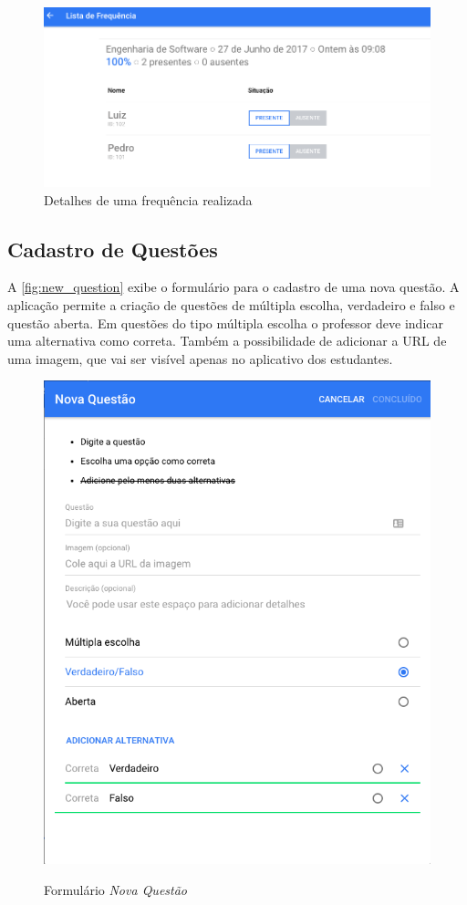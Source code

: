 \begin{figure}[ht]
  \centering
  \caption{Detalhes de uma frequência realizada}
  \label{fig:list_freq}
  \includegraphics[scale=.35]{imagens/telas/list_freq}
  \doautor
\end{figure}


\subsection{Cadastro de Questões}

A \autoref{fig:new_question} exibe o formulário para o cadastro de uma nova questão.
A aplicação permite a criação de questões de múltipla escolha, verdadeiro e falso e questão aberta.
Em questões do tipo múltipla escolha o professor deve indicar uma alternativa como correta.
Também a possibilidade de adicionar a URL de uma imagem, que vai ser visível apenas no aplicativo dos estudantes.

\begin{figure}[ht]
  \centering
  \caption{Formulário \textit{Nova Questão}}
  \includegraphics[scale=.5]{imagens/telas/new_question}
  \doautor
  \label{fig:new_question}
\end{figure}

